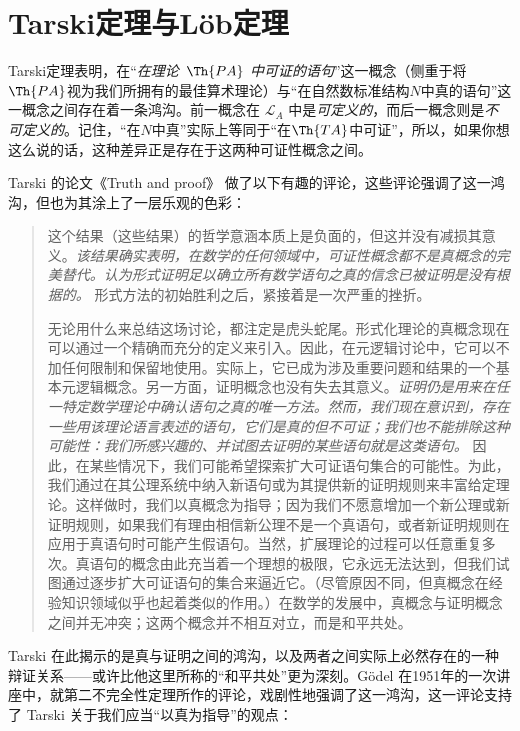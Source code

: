 \section{Tarski定理与Löb定理}

Tarski定理表明，在“\emph{在理论~$\Th{PA}$ 中可证的语句}”这一概念（侧重于将$\Th{PA}$视为我们所拥有的最佳算术理论）与“在自然数标准结构$N$中真的语句”这一概念之间存在着一条鸿沟。前一概念在 $\mathcal{L}_{A}$ 中是\emph{可定义的}，而后一概念则是\emph{不可定义的}。记住，“在$N$中真”实际上等同于“在$\Th{TA}$中可证”，所以，如果你想这么说的话，这种差异正是存在于这两种可证性概念之间。

Tarski 的论文《Truth and proof》\citep{Tarski1969} 做了以下有趣的评论，这些评论强调了这一鸿沟，但也为其涂上了一层乐观的色彩：

\begin{quotation}
这个结果（这些结果）的哲学意涵本质上是负面的，但这并没有减损其意义。\emph{该结果确实表明，在数学的任何领域中，可证性概念都不是真概念的完美替代。认为形式证明足以确立所有数学语句之真的信念已被证明是没有根据的。} 形式方法的初始胜利之后，紧接着是一次严重的挫折。

无论用什么来总结这场讨论，都注定是虎头蛇尾。形式化理论的真概念现在可以通过一个精确而充分的定义来引入。因此，在元逻辑讨论中，它可以不加任何限制和保留地使用。实际上，它已成为涉及重要问题和结果的一个基本元逻辑概念。另一方面，证明概念也没有失去其意义。\emph{证明仍是用来在任一特定数学理论中确认语句之真的唯一方法。然而，我们现在意识到，存在一些用该理论语言表述的语句，它们是真的但不可证；我们也不能排除这种可能性：我们所感兴趣的、并试图去证明的某些语句就是这类语句。} 因此，在某些情况下，我们可能希望探索扩大可证语句集合的可能性。为此，我们通过在其公理系统中纳入新语句或为其提供新的证明规则来丰富给定理论。这样做时，我们以真概念为指导；因为我们不愿意增加一个新公理或新证明规则，如果我们有理由相信新公理不是一个真语句，或者新证明规则在应用于真语句时可能产生假语句。当然，扩展理论的过程可以任意重复多次。真语句的概念由此充当着一个理想的极限，它永远无法达到，但我们试图通过逐步扩大可证语句的集合来逼近它。（尽管原因不同，但真概念在经验知识领域似乎也起着类似的作用。）在数学的发展中，真概念与证明概念之间并无冲突；这两个概念并不相互对立，而是和平共处。\citep[p.~77, 强调为原文所加]{Tarski1969}
\end{quotation}

Tarski 在此揭示的是真与证明之间的鸿沟，以及两者之间实际上必然存在的一种辩证关系——或许比他这里所称的“和平共处”更为深刻。Gödel 在1951年的一次讲座中，就第二不完全性定理所作的评论，戏剧性地强调了这一鸿沟，这一评论支持了 Tarski 关于我们应当“以真为指导”的观点：

